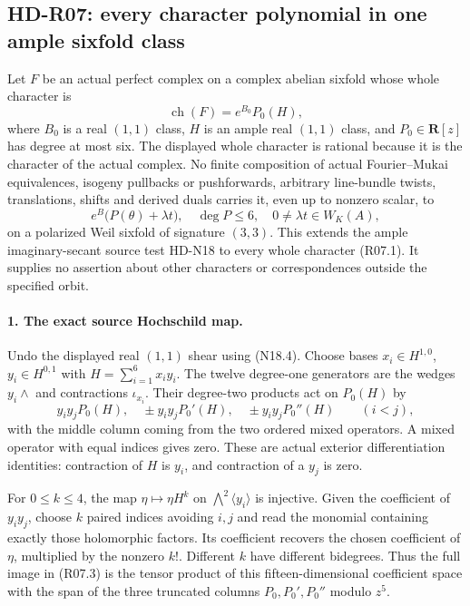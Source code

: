 \subsection{HD-R07: every character polynomial in one ample sixfold class}
\label{sec:ample-polynomial-sixfold-orbits}

Let $F$ be an actual perfect complex on a complex abelian sixfold
whose whole character is
\[
                 \operatorname{ch}(F)=e^{B_0}P_0(H),           \tag{R07.1}
\]
where $B_0$ is a real $(1,1)$ class, $H$ is an ample real
$(1,1)$ class, and $P_0\in\mathbf R[z]$ has degree at most six.
The displayed whole character is rational because it is the
character of the actual complex. No finite composition of actual
Fourier--Mukai equivalences, isogeny pullbacks or pushforwards,
arbitrary line-bundle twists, translations, shifts and derived
duals carries it, even up to nonzero scalar, to
\[
 e^B\bigl(P(\theta)+\lambda t\bigr),\quad
 \deg P\le6,\quad0\ne\lambda t\in W_K(A),                    \tag{R07.2}
\]
on a polarized Weil sixfold of signature $(3,3)$.
This extends the ample imaginary-secant source test HD-N18 to
every whole character (R07.1). It supplies no assertion about
other characters or correspondences outside the specified orbit.

\paragraph{1. The exact source Hochschild map.}
Undo the displayed real $(1,1)$ shear using (N18.4). Choose
bases $x_i\in H^{1,0}$, $y_i\in H^{0,1}$ with
$H=\sum_{i=1}^6x_i y_i$. The twelve degree-one generators
are the wedges $y_i\wedge$ and contractions $\iota_{x_i}$.
Their degree-two products act on $P_0(H)$ by
\[
 y_i y_j P_0(H),\quad
 \pm y_i y_j P_0'(H),\quad
 \pm y_i y_j P_0''(H)\qquad(i<j),                            \tag{R07.3}
\]
with the middle column coming from the two ordered mixed
operators. A mixed operator with equal indices gives zero.
These are actual exterior differentiation identities: contraction
of $H$ is $y_i$, and contraction of a $y_j$ is zero.

For $0\le k\le4$, the map
$\eta\mapsto\eta H^k$ on $\bigwedge^2\langle y_i\rangle$
is injective. Given the coefficient of $y_i y_j$, choose $k$
paired indices avoiding $i,j$ and read the monomial containing
exactly those holomorphic factors. Its coefficient recovers the
chosen coefficient of $\eta$, multiplied by the nonzero $k!$.
Different $k$ have different bidegrees. Thus the full image in
(R07.3) is the tensor product of this fifteen-dimensional
coefficient space with the span of the three truncated columns
$P_0,P_0',P_0''$ modulo $z^5$.

